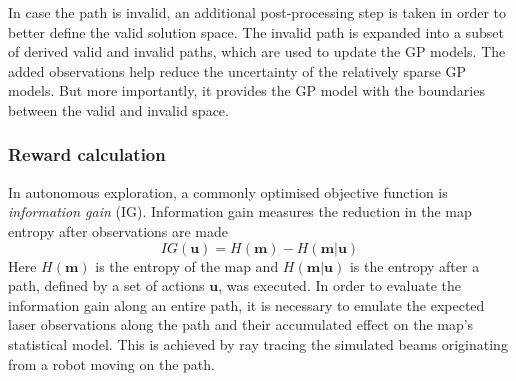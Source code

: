\documentclass[shortAfour,sageh,times]{sagej_no_sage}
\begin{document}
	In case the path is invalid, an additional post-processing step is taken in order to better define the valid solution space. The invalid path is expanded into a subset of derived valid and invalid paths, which are used to update the GP models. The added observations help reduce the uncertainty of the relatively sparse GP models. But more importantly, it provides the GP model with the boundaries between the valid and invalid space.
	
\subsubsection{Reward calculation}	\hfill \break
	In autonomous exploration, a commonly optimised objective function is \textit{information gain} (IG). Information gain measures the reduction in the map entropy after observations are made
	\begin{equation}\label{IG}
		IG(\boldsymbol{u}) = H(\boldsymbol{m}) - H(\boldsymbol{m}|\boldsymbol{u})
	\end{equation}
	Here $ H(\boldsymbol{m})$ is the entropy of the map and $H(\boldsymbol{m}|\boldsymbol{u})$ is the entropy after a path, defined by a set of actions $\boldsymbol{u}$, was executed. In order to evaluate the information gain along an entire path, it is necessary to emulate the expected laser observations along the path and their accumulated effect on the map's statistical model. This is achieved by ray tracing the simulated beams originating from a robot moving on the path.
	
\end{document}
